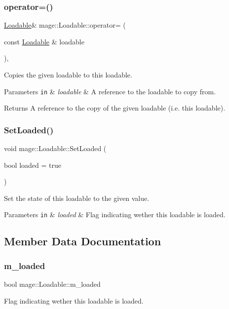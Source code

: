 \subsubsection{\texorpdfstring{operator=()}{operator=()}}
{\footnotesize\ttfamily \hyperlink{classmage_1_1_loadable}{Loadable}\& mage\+::\+Loadable\+::operator= (\begin{DoxyParamCaption}\item[{const \hyperlink{classmage_1_1_loadable}{Loadable} \&}]{loadable }\end{DoxyParamCaption})\hspace{0.3cm}{\ttfamily [protected]}, {\ttfamily [default]}}

Copies the given loadable to this loadable.


\begin{DoxyParams}[1]{Parameters}
\mbox{\tt in}  & {\em loadable} & A reference to the loadable to copy from. \\
\hline
\end{DoxyParams}
\begin{DoxyReturn}{Returns}
A reference to the copy of the given loadable (i.\+e. this loadable). 
\end{DoxyReturn}
\hypertarget{classmage_1_1_loadable_a932ff8b287c8e68e30a13804cba08ff2}{}\label{classmage_1_1_loadable_a932ff8b287c8e68e30a13804cba08ff2} 
\subsubsection{\texorpdfstring{Set\+Loaded()}{SetLoaded()}}
{\footnotesize\ttfamily void mage\+::\+Loadable\+::\+Set\+Loaded (\begin{DoxyParamCaption}\item[{bool}]{loaded = {\ttfamily true} }\end{DoxyParamCaption})\hspace{0.3cm}{\ttfamily [protected]}}

Set the state of this loadable to the given value.


\begin{DoxyParams}[1]{Parameters}
\mbox{\tt in}  & {\em loaded} & Flag indicating wether this loadable is loaded. \\
\hline
\end{DoxyParams}


\subsection{Member Data Documentation}
\hypertarget{classmage_1_1_loadable_a993963fbfeb0f2e2ab9616bf7ef6a0f7}{}\label{classmage_1_1_loadable_a993963fbfeb0f2e2ab9616bf7ef6a0f7} 
\subsubsection{\texorpdfstring{m\+\_\+loaded}{m\_loaded}}
{\footnotesize\ttfamily bool mage\+::\+Loadable\+::m\+\_\+loaded\hspace{0.3cm}{\ttfamily [private]}}

Flag indicating wether this loadable is loaded. 